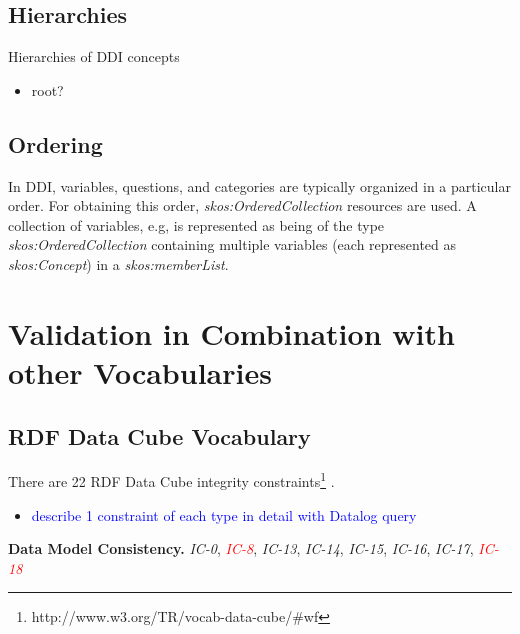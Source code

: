 \documentclass{elsart3p}    %
\begin{document}
{\subsection{Hierarchies}

Hierarchies of DDI concepts

\begin{itemize}
	\item root?
\end{itemize}

\subsection{Ordering}

In DDI, variables, questions, and categories are typically organized in a particular order. 
For obtaining this order, {\em skos:OrderedCollection} resources are used. 
A collection of variables, e.g, is represented as being of the type {\em skos:OrderedCollection} containing multiple variables (each represented as {\em skos:Concept}) in a {\em skos:memberList}. 

\section{Validation in Combination with other Vocabularies}

\subsection{RDF Data Cube Vocabulary}

There are 22 RDF Data Cube integrity constraints\footnote{http://www.w3.org/TR/vocab-data-cube/\#wf} \cite{CyganiakReynolds2014}.

\begin{itemize}
	\item \textcolor{blue}{describe 1 constraint of each type in detail with Datalog query}
\end{itemize}

\textbf{Data Model Consistency.}
{\em IC-0}, \textcolor{red}{{\em IC-8}}, {\em IC-13}, {\em IC-14}, {\em IC-15}, {\em IC-16}, {\em IC-17}, \textcolor{red}{{\em IC-18}}

}
\end{document}
